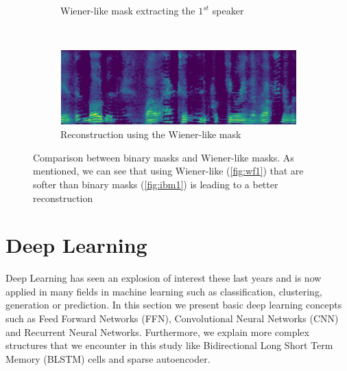 \documentclass[master, tikz, final,11pt, dvipdfmx]{iscs-thesis}
\begin{document}
\begin{figure}[h]
\begin{subfigure}[b]{0.45\textwidth}
\captionsetup{justification=centering}
\caption{Wiener-like mask extracting the  $1^{st}$ speaker}
\label{fig:wf1} 
\end{subfigure}
~
\begin{subfigure}[b]{0.45\textwidth}
\includegraphics[width=\textwidth]{sepwf1}
\captionsetup{justification=centering}
\caption{Reconstruction using the Wiener-like mask}
\label{fig:ibmsep1} 
\end{subfigure}
\captionsetup{justification=centering}
\caption[IBM and Wiener-like masks comparison]{Comparison between binary masks and Wiener-like masks. As mentioned, we can see that using Wiener-like (\autoref{fig:wf1}) that are softer than binary masks (\autoref{fig:ibm1}) is leading to a better reconstruction}
\label{fig:masking} 

\end{figure}

\section{Deep Learning}

Deep Learning \cite{DL, DLBOOK} has seen an explosion of interest these last years and is now applied in many fields in machine learning such as classification, clustering, generation or prediction. In this section we present basic deep learning concepts such as Feed Forward Networks (FFN), Convolutional Neural Networks (CNN) and Recurrent Neural Networks. Furthermore, we explain more complex structures that we encounter in this study like Bidirectional Long Short Term Memory (BLSTM) cells and sparse autoencoder.
\end{document}
